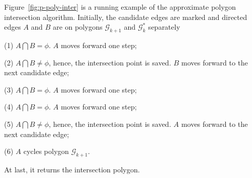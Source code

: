 \begin{example}
Figure~\ref{fig:p-poly-inter} is a running example of the approximate polygon intersection algorithm.
Initially, the candidate edges are marked and directed edges $A$ and $B$ are on polygons $\mathcal{G}_{k+1}$ and $\mathcal{G}^*_{k}$ separately

\ni (1) $A \bigcap B = \phi$. $A$ moves forward one step;

\ni (2) $A \bigcap B \ne \phi$, hence, the intersection point is saved. $B$ moves forward to the next candidate edge;

\ni (3) $A \bigcap B = \phi$. $A$ moves forward one step;

\ni (4) $A \bigcap B = \phi$. $A$ moves forward one step;

\ni (5) $A \bigcap B \ne \phi$, hence, the intersection point is saved. $A$ moves forward to the next candidate edge;

\ni (6) $A$ cycles polygon $\mathcal{G}_{k+1}$.

At last, it returns the intersection polygon.
\end{example}






